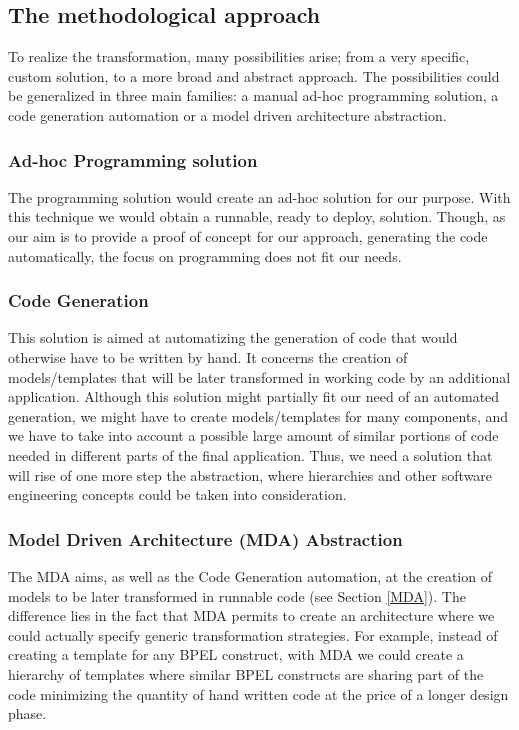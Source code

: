 \subsection{The methodological approach}
\label{sec:ProgrammingVsMDE}
To realize the transformation, many possibilities arise; from a very specific, custom solution, to a more broad and abstract approach. The possibilities could be generalized in three main families: a manual ad-hoc programming solution, a code generation automation or a model driven architecture abstraction.
  \subsubsection{Ad-hoc Programming solution}
The programming solution would create an ad-hoc solution for our purpose. With this technique we would obtain a runnable, ready to deploy, solution. Though, as our aim is to provide a proof of concept for our approach, generating the code automatically, the focus on programming does not fit our needs.
  \subsubsection{Code Generation}
This solution is aimed at automatizing the generation of code that would otherwise have to be written by hand. It concerns the creation of models/templates that will be later transformed in working code by an additional application. Although this solution might partially fit our need of an automated generation, we might have to create models/templates for many components, and we have to take into account a possible large amount of similar portions of code needed in different parts of the final application.  Thus, we need a solution that will rise of one more step the abstraction, where hierarchies and other software engineering concepts could be taken into consideration.
  
 \subsubsection{Model Driven Architecture (MDA) Abstraction}
The MDA aims, as well as the Code Generation automation, at the creation of models to be later transformed in runnable code (see Section \ref{MDA}). The difference lies in the fact that MDA permits to create an architecture where we could actually specify generic transformation strategies. For example, instead of creating a template for any BPEL construct, with MDA we could create a hierarchy of templates where similar BPEL constructs are sharing part of the code minimizing the quantity of hand written code at the price of a longer design phase.
